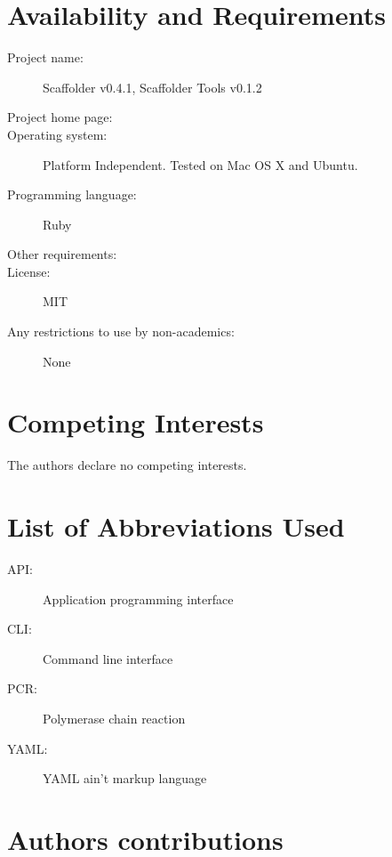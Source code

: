 \documentclass[10pt]{bmc_article}
\newenvironment{bmcformat}{\begin{raggedright}\baselineskip20pt\sloppy\setboolean{publ}{false}}{\end{raggedright}\baselineskip20pt\sloppy}
\begin{document}
\begin{bmcformat}
\clearpage

\section*{Availability and Requirements} %

  \begin{description}
    \item[Project name:] Scaffolder v0.4.1, Scaffolder Tools v0.1.2
    \item[Project home page:] \scaffolder
    \item[Operating system:] Platform Independent. Tested on Mac OS X and
    Ubuntu.
    \item[Programming language:] Ruby
    \item[Other requirements:] 
    \item[License:] MIT
    \item[Any restrictions to use by non-academics:] None
  \end{description}

\clearpage

\section*{Competing Interests} %

The authors declare no competing interests.

\section*{List of Abbreviations Used} %

  \begin{description}
    \item[API:] Application programming interface
    \item[CLI:] Command line interface
    \item[PCR:] Polymerase chain reaction
    \item[YAML:] YAML ain't markup language\cite{yaml}
  \end{description}

\section*{Authors contributions} %


\end{bmcformat}
\end{document}
